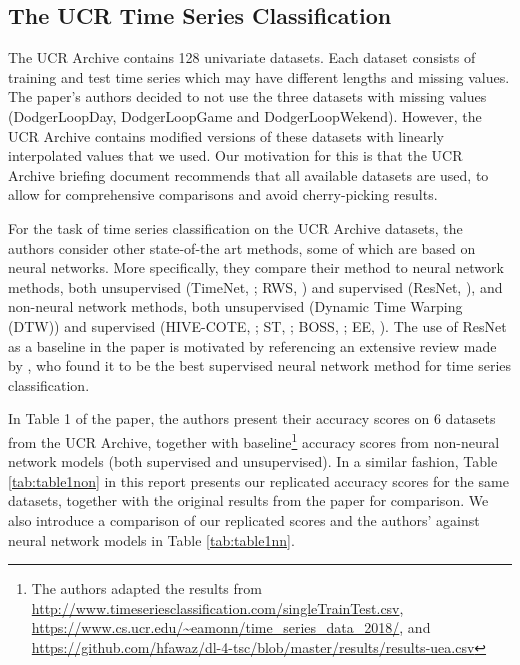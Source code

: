 \newpage
\subsection{The UCR Time Series Classification}
\label{ucr}

The UCR Archive contains 128 univariate datasets. Each dataset consists of training and test time series which may have different lengths and missing values. The paper's authors decided to not use the three datasets with missing values (DodgerLoopDay, DodgerLoopGame and DodgerLoopWekend). However, the UCR Archive contains modified versions of these datasets with linearly interpolated values that we used. Our motivation for this is that the UCR Archive briefing document recommends that all available datasets are used, to allow for comprehensive comparisons and avoid cherry-picking results.


For the task of time series classification on the UCR Archive datasets, the authors consider other state-of-the art methods, some of which are based on neural networks. More specifically, they compare their method to neural network methods, both unsupervised (TimeNet, \cite{TimenetMalhotraTVAS17}; RWS, \cite{RWSwu2018random}) and supervised (ResNet, \cite{ResNetHe2015}), and non-neural network methods, both unsupervised (Dynamic Time Warping (DTW)) and supervised (HIVE-COTE, \cite{hivecote}; ST, \cite{STBostrombagnall}; BOSS, \cite{BOSSSchafer:2015:BCT:2833463.2833468}; EE, \cite{EELines2015}).
The use of ResNet as a baseline in the paper is motivated by referencing an extensive review made by \cite{fawaz2019deep}, who found it to be the best supervised neural network method for time series classification.


In Table 1 of the paper, the authors present their accuracy scores on 6 datasets from the UCR Archive, together with baseline\footnote{The authors adapted the results from \url{http://www.timeseriesclassification.com/singleTrainTest.csv}, \url{https://www.cs.ucr.edu/~eamonn/time_series_data_2018/}, and \url{https://github.com/hfawaz/dl-4-tsc/blob/master/results/results-uea.csv}}
accuracy scores from non-neural network models (both supervised and unsupervised). In a similar fashion, Table \ref{tab:table1non} in this report presents our replicated accuracy scores for the same datasets, together with the original results from the paper for comparison. We also introduce a comparison of our replicated scores and the authors' against neural network models in Table \ref{tab:table1nn}.

